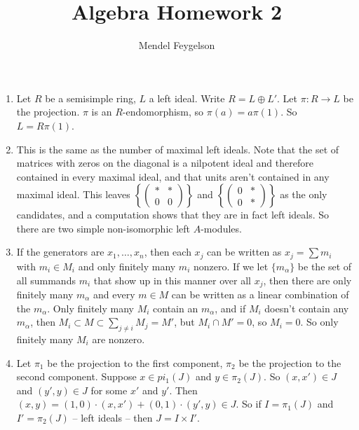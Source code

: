 \documentclass{article}
\title{Algebra Homework 2}
\author{Mendel Feygelson}
\begin{document}
\maketitle
\begin{enumerate}

   \item Let $R$ be a semisimple ring, $L$ a left ideal. Write $R = L \oplus
      L'$. Let $\pi : R \to L$ be the projection. $\pi$ is an $R$-endomorphism,
      so $\pi(a) = a\pi(1)$. So $L = R\pi(1)$.

   \item This is the same as the number of maximal left ideals. Note that the
      set of matrices with zeros on the diagonal is a nilpotent ideal and
      therefore contained in every maximal ideal, and that units aren't
      contained in any maximal ideal. This leaves
      $\left\{\begin{pmatrix}*&*\\0&0\end{pmatrix}\right\}$ and
      $\left\{\begin{pmatrix}0&*\\0&*\end{pmatrix}\right\}$ as the only
      candidates, and a computation shows that they are in fact left ideals. So
      there are two simple non-isomorphic left $A$-modules.

   \item If the generators are $x_1,\dotsc,x_n$, then each $x_j$ can be written
      as $x_j = \sum m_i$ with $m_i \in M_i$ and only finitely many $m_i$
      nonzero. If we let $\{m_\alpha\}$ be the set of all summands $m_i$ that
      show up in this manner over all $x_j$, then there are only finitely many
      $m_\alpha$ and every $m \in M$ can be written as a linear combination of
      the $m_\alpha$. Only finitely many $M_i$ contain an $m_\alpha$, and if $M_i$
      doesn't contain any $m_\alpha$, then $M_i \subset M \subset \sum_{j \neq
      i} M_j = M'$, but $M_i \cap M' = 0$, so $M_i = 0$. So only finitely many
      $M_i$ are nonzero.

   \item Let $\pi_1$ be the projection to the first component, $\pi_2$ be the
      projection to the second component. Suppose $x \in pi_1(J)$ and $y \in
      \pi_2(J)$. So $(x,x') \in J$ and $(y',y) \in J$ for some $x'$ and $y'$.
      Then $(x,y) = (1,0) \cdot (x,x') + (0,1) \cdot (y',y) \in J$. So if $I =
      \pi_1(J)$ and $I' = \pi_2(J)$ -- left ideals -- then $J = I \times I'$.
      

\end{enumerate}
\end{document}
